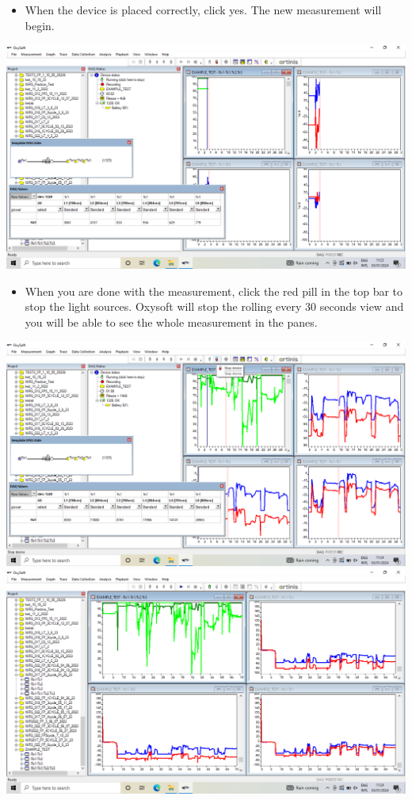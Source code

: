 \documentclass[
]{book}
\providecommand{\tightlist}{%
  \setlength{\itemsep}{0pt}\setlength{\parskip}{0pt}}
\begin{document}
\begin{itemize}
\tightlist
\item
  When the device is placed correctly, click yes. The new measurement will begin.
\end{itemize}

\includegraphics[width=1\linewidth]{images/startnewmeasurement/new_measurement_begins}

\begin{itemize}
\tightlist
\item
  When you are done with the measurement, click the red pill in the top bar to stop the light sources. Oxysoft will stop the rolling every 30 seconds view and you will be able to see the whole measurement in the panes.
\end{itemize}

\includegraphics[width=1\linewidth]{images/startnewmeasurement/select_end_measurement}
\includegraphics[width=1\linewidth]{images/startnewmeasurement/view_whole_measurement}
\end{document}
